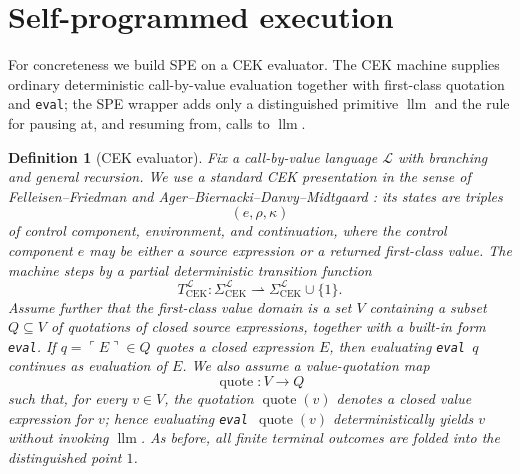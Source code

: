 \documentclass[11pt]{article}
\newtheorem{definition}{Definition}[section]
\newcommand{\quoteop}{\operatorname{quote}}
\newcommand{\llm}{\operatorname{llm}}
\begin{document}
\section{Self-programmed execution}

For concreteness we build SPE on a CEK evaluator. The CEK machine supplies ordinary deterministic call-by-value evaluation together with first-class quotation and \texttt{eval}; the SPE wrapper adds only a distinguished primitive $\llm$ and the rule for pausing at, and resuming from, calls to $\llm$.

\begin{definition}[CEK evaluator]\label{def:cek}
Fix a call-by-value language $\mathcal{L}$ with branching and general recursion. We use a standard CEK presentation in the sense of Felleisen--Friedman and Ager--Biernacki--Danvy--Midtgaard \cite{FelleisenFriedman86,AgerEtAl03}: its states are triples
\[
(e,\rho,\kappa)
\]
of control component, environment, and continuation, where the control component $e$ may be either a source expression or a returned first-class value. The machine steps by a partial deterministic transition function
\[
T_{\mathrm{CEK}}^{\mathcal{L}}: \Sigma_{\mathrm{CEK}}^{\mathcal{L}} \rightharpoonup \Sigma_{\mathrm{CEK}}^{\mathcal{L}}\cup\{1\}.
\]
Assume further that the first-class value domain is a set $V$ containing a subset $Q\subseteq V$ of quotations of closed source expressions, together with a built-in form \texttt{eval}. If $q=\ulcorner E\urcorner\in Q$ quotes a closed expression $E$, then evaluating \texttt{eval} $\,q$ continues as evaluation of $E$. We also assume a value-quotation map
\[
\quoteop:V\to Q
\]
such that, for every $v\in V$, the quotation $\quoteop(v)$ denotes a closed value expression for $v$; hence evaluating \texttt{eval} $\,\quoteop(v)$ deterministically yields $v$ without invoking $\llm$. As before, all finite terminal outcomes are folded into the distinguished point $1$.
\end{definition}
\end{document}
